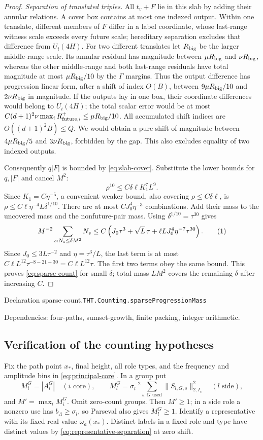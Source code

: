 \documentclass[11pt]{article}
\theoremstyle{definition}
\newcommand{\eqtag}[1]{\refstepcounter{equation}\tag{\theequation}\label{#1}}
\numberwithin{equation}{section}
\newcommand{\bp}[3]{\par\smallskip\begingroup\footnotesize
\noindent\hypertarget{bp:#1}{\textsf{Declaration #1.}}\quad\nolinkurl{#2}\par
\noindent\textsf{Dependencies:} #3.\par\endgroup\smallskip}
\begin{document}
\begin{proof}
\emph{Separation of translated triples.} All $t_v+F$ lie in this slab by adding their annular relations. A cover box contains at most one indexed output. Within one translate, different members of $F$ differ in a label coordinate, whose last-range witness scale exceeds every future scale; hereditary separation excludes that difference from $U_i(4H)$. For two different translates let $R_{\rm big}$ be the larger middle-range scale. Its annular residual has magnitude between $\mu R_{\rm big}$ and $\nu R_{\rm big}$, whereas the other middle-range and both last-range residuals have total magnitude at most $\mu R_{\rm big}/10$ by the $\Gamma$ margins. Thus the output difference has progression linear form, after a shift of index $O(B)$, between $9\mu R_{\rm big}/10$ and $2\nu R_{\rm big}$ in magnitude. If the outputs lay in one box, their coordinate differences would belong to $U_i(4H)$; the total scalar error would be at most $C(d+1)^2\nu\max_iR_{{\rm future},i}^+\le\mu R_{\rm big}/10$. All accumulated shift indices are $O((d+1)^2B)\le Q$. We would obtain a pure shift of magnitude between $4\mu R_{\rm big}/5$ and $3\nu R_{\rm big}$, forbidden by the gap. This also excludes equality of two indexed outputs.

Consequently $q|F|$ is bounded by \eqref{eq:slab-cover}. Substitute the lower bounds for $q,|F|$ and cancel $M^2$:
\[
 \rho^{10}\le C\delta\ell K_1^7L^9.
\]
Since $K_1=C\eta^{-5}$, a convenient weaker bound, also covering $\rho\le C\delta\ell$, is $\rho\le C\ell\eta^{-4}L\delta^{1/10}$. There are at most $CJ_0^4\eta^{-3}$ combinations. Add their mass to the uncovered mass and the nonfuture-pair mass. Using $\delta^{1/10}=\tau^{30}$ gives
\[
 M^{-2}\sum_{s:N_s\le\delta M^2}N_s
 \le C\left(J_0\tau^3+\sqrt L\,\tau
              +\ell L J_0^4\eta^{-7}\tau^{30}\right).
 \eqtag{eq:count-balance}
\]
Since $J_0\le3L\tau^{-2}$ and $\eta=\tau^3/L$, the last term is at most $C\ell L^{12}\tau^{-8-21+30}=C\ell L^{12}\tau$. The first two terms obey the same bound. This proves \eqref{eq:sparse-count} for small $\delta$; total mass $LM^2$ covers the remaining $\delta$ after increasing $C$.
\end{proof}
\bp{sparse-count}{THT.Counting.sparseProgressionMass}{four-paths, sumset-growth, finite packing, integer arithmetic}


\subsection*{Verification of the counting hypotheses}
Fix the path point $x_*$, final height, all role types, and the frequency and amplitude bins in \eqref{eq:principal-core}. In a group put
\[
 M_i^G=|A_i^G|\quad(i\text{ core}),\qquad
 M_l^G=\sigma_l^{-2}\sum_{s:G\text{ used}}\|S_{l,G,s}\|_{2,I_s}^2\quad(l\text{ side}),
\]
and $M'=\max_iM_i^G$. Omit zero-count groups. Then $M'\ge1$; in a side role a nonzero use has $b_\Lambda\ge\sigma_l$, so Parseval also gives $M_l^G\ge1$. Identify a representative with its fixed real value $\omega_a(x_*)$. Distinct labels in a fixed role and type have distinct values by \eqref{eq:representative-separation} at zero shift.
\end{document}
